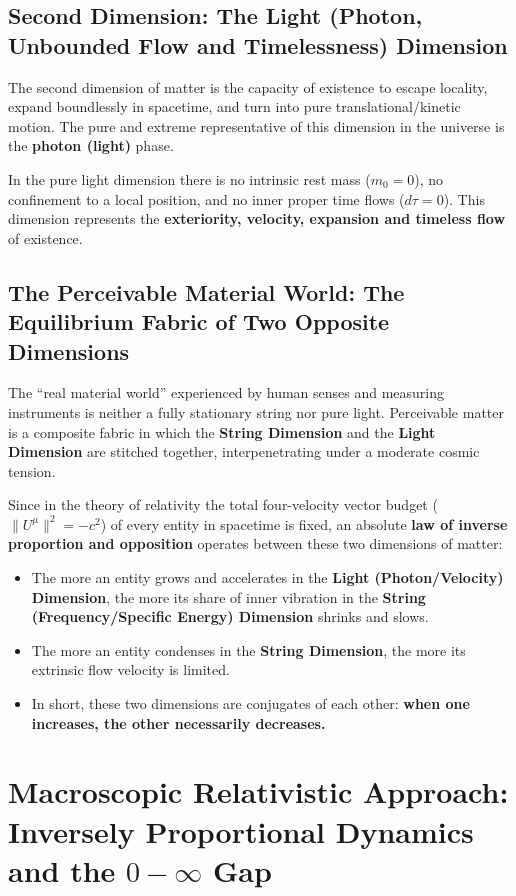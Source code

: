 \documentclass[12pt,a4paper]{article}
\begin{document}
\subsection{Second Dimension: The Light (Photon, Unbounded Flow and Timelessness) Dimension}

The second dimension of matter is the capacity of existence to escape locality, expand boundlessly in spacetime, and turn into pure translational/kinetic motion. The pure and extreme representative of this dimension in the universe is the \textbf{photon (light)} phase.

In the pure light dimension there is no intrinsic rest mass ($m_0 = 0$), no confinement to a local position, and no inner proper time flows ($d\tau = 0$). This dimension represents the \textbf{exteriority, velocity, expansion and timeless flow} of existence.

\subsection{The Perceivable Material World: The Equilibrium Fabric of Two Opposite Dimensions}

The ``real material world'' experienced by human senses and measuring instruments is neither a fully stationary string nor pure light. Perceivable matter is a composite fabric in which the \textbf{String Dimension} and the \textbf{Light Dimension} are stitched together, interpenetrating under a moderate cosmic tension.

Since in the theory of relativity the total four-velocity vector budget ($\|U^\mu\|^2 = -c^2$) of every entity in spacetime is fixed, an absolute \textbf{law of inverse proportion and opposition} operates between these two dimensions of matter:
\begin{itemize}
    \item The more an entity grows and accelerates in the \textbf{Light (Photon/Velocity) Dimension}, the more its share of inner vibration in the \textbf{String (Frequency/Specific Energy) Dimension} shrinks and slows.
    \item The more an entity condenses in the \textbf{String Dimension}, the more its extrinsic flow velocity is limited.
    \item In short, these two dimensions are conjugates of each other: \textbf{when one increases, the other necessarily decreases.}
\end{itemize}

\section{Macroscopic Relativistic Approach: Inversely Proportional Dynamics and the $0 - \infty$ Gap}
\end{document}
